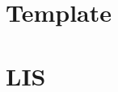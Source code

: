 \documentclass[9pt, landscape]{article}
\begin{document}
\raggedright
\footnotesize
\begin{multicols}{3}
\setlength{\premulticols}{1pt}
\setlength{\postmulticols}{1pt}
\setlength{\multicolsep}{1pt}
\setlength{\columnsep}{2pt}

\section{Template}


\section{LIS}


\end{multicols}
\end{document}
